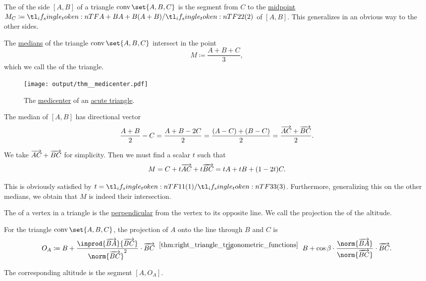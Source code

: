 \begin{definition}\label{def:triangle_median}\mimprovised
  The  of the side \( [A, B] \) of a triangle \( \conv\set{ A, B, C } \) is the segment from \( C \) to the \hyperref[def:midpoint]{midpoint} \( M_C \coloneqq \ifrac {A + B} 2 \) of \( [A, B] \). This generalizes in an obvious way to the other sides.
\end{definition}

\begin{proposition}\label{thm:medicenter}
  The \hyperref[def:triangle_median]{medians} of the triangle \( \conv\set{ A, B, C } \) intersect in the point
  \begin{equation*}
    M \coloneqq \frac {A + B + C} 3,
  \end{equation*}
  which we call the  of the triangle.

  \begin{figure}[!ht]
    \centering
    \texttt{[image: output/thm\_\_medicenter.pdf]}
    \caption{The \hyperref[thm:medicenter]{medicenter} of an \hyperref[def:triangle/acute]{acute triangle}.}\label{fig:thm:medicenter}
  \end{figure}
\end{proposition}
\begin{defproof}
  The median of \( [A, B] \) has directional vector
  \begin{equation*}
    \frac {A + B} 2 - C
    =
    \frac {A + B - 2C} 2
    =
    \frac {(A - C) + (B - C)} 2
    =
    \frac {\overrightarrow{AC} + \overrightarrow{BC}} 2.
  \end{equation*}

  We take \( \overrightarrow{AC} + \overrightarrow{BC} \) for simplicity. Then we must find a scalar \( t \) such that
  \begin{equation*}
    M = C + t \overrightarrow{AC} + t \overrightarrow{BC} = t A + t B + (1 - 2t) C.
  \end{equation*}

  This is obviously satisfied by \( t = \ifrac 1 3 \). Furthermore, generalizing this on the other medians, we obtain that \( M \) is indeed their intersection.
\end{defproof}

\begin{definition}\label{def:triangle_altitude}
  The  of a vertex in a triangle is the \hyperref[def:perpendicularity]{perpendicular} from the vertex to its opposite line. We call the projection the  of the altitude.

  For the triangle \( \conv\set{ A, B, C } \), the projection of \( A \) onto the line through \( B \) and \( C \) is
  \begin{equation*}
    O_A
    \coloneqq
    B + \frac {\inprod {\vect{BA}} {\vect{BC}}} {\norm{\vect{BC}}^2} \cdot \vect{BC}
    \reloset {\ref{thm:right_triangle_trigonometric_functions}} =
    B + \cos \beta \cdot \frac {\norm{\vect{BA}}} {\norm{\vect{BC}}} \cdot \vect{BC}.
  \end{equation*}

  The corresponding altitude is the segment \( [A, O_A] \).
\end{definition}

